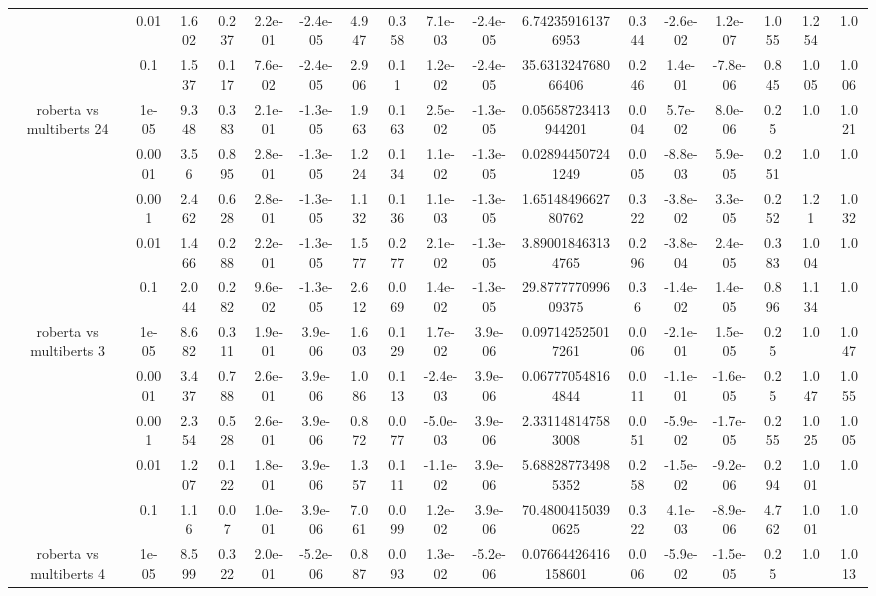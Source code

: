 \begin{tabular}{|c|c|c|c|c|c|c|c|c|c|c|c|c|c|c|c|c|}
 & 0.01 & 1.602 & 0.237 & 2.2e-01 & -2.4e-05 & 4.947 & 0.358 & 7.1e-03 & -2.4e-05 & 6.742359161376953 & 0.344 & -2.6e-02 & 1.2e-07 & 1.055 & 1.254 & 1.0 \\
 & 0.1 & 1.537 & 0.117 & 7.6e-02 & -2.4e-05 & 2.906 & 0.11 & 1.2e-02 & -2.4e-05 & 35.631324768066406 & 0.246 & 1.4e-01 & -7.8e-06 & 0.845 & 1.005 & 1.006 \\
\hline
\multirow{5}{*}{roberta  vs multiberts 24} & 1e-05 & 9.348 & 0.383 & 2.1e-01 & -1.3e-05 & 1.963 & 0.163 & 2.5e-02 & -1.3e-05 & 0.05658723413944201 & 0.004 & 5.7e-02 & 8.0e-06 & 0.25 & 1.0 & 1.021 \\
 & 0.0001 & 3.56 & 0.895 & 2.8e-01 & -1.3e-05 & 1.224 & 0.134 & 1.1e-02 & -1.3e-05 & 0.028944507241249 & 0.005 & -8.8e-03 & 5.9e-05 & 0.251 & 1.0 & 1.0 \\
 & 0.001 & 2.462 & 0.628 & 2.8e-01 & -1.3e-05 & 1.132 & 0.136 & 1.1e-03 & -1.3e-05 & 1.6514849662780762 & 0.322 & -3.8e-02 & 3.3e-05 & 0.252 & 1.21 & 1.032 \\
 & 0.01 & 1.466 & 0.288 & 2.2e-01 & -1.3e-05 & 1.577 & 0.277 & 2.1e-02 & -1.3e-05 & 3.890018463134765 & 0.296 & -3.8e-04 & 2.4e-05 & 0.383 & 1.004 & 1.0 \\
 & 0.1 & 2.044 & 0.282 & 9.6e-02 & -1.3e-05 & 2.612 & 0.069 & 1.4e-02 & -1.3e-05 & 29.877777099609375 & 0.36 & -1.4e-02 & 1.4e-05 & 0.896 & 1.134 & 1.0 \\
\hline
\multirow{5}{*}{roberta  vs multiberts 3} & 1e-05 & 8.682 & 0.311 & 1.9e-01 & 3.9e-06 & 1.603 & 0.129 & 1.7e-02 & 3.9e-06 & 0.097142525017261 & 0.006 & -2.1e-01 & 1.5e-05 & 0.25 & 1.0 & 1.047 \\
 & 0.0001 & 3.437 & 0.788 & 2.6e-01 & 3.9e-06 & 1.086 & 0.113 & -2.4e-03 & 3.9e-06 & 0.067770548164844 & 0.011 & -1.1e-01 & -1.6e-05 & 0.25 & 1.047 & 1.055 \\
 & 0.001 & 2.354 & 0.528 & 2.6e-01 & 3.9e-06 & 0.872 & 0.077 & -5.0e-03 & 3.9e-06 & 2.331148147583008 & 0.051 & -5.9e-02 & -1.7e-05 & 0.255 & 1.025 & 1.005 \\
 & 0.01 & 1.207 & 0.122 & 1.8e-01 & 3.9e-06 & 1.357 & 0.111 & -1.1e-02 & 3.9e-06 & 5.688287734985352 & 0.258 & -1.5e-02 & -9.2e-06 & 0.294 & 1.001 & 1.0 \\
 & 0.1 & 1.16 & 0.07 & 1.0e-01 & 3.9e-06 & 7.061 & 0.099 & 1.2e-02 & 3.9e-06 & 70.48004150390625 & 0.322 & 4.1e-03 & -8.9e-06 & 4.762 & 1.001 & 1.0 \\
\hline
\multirow{5}{*}{roberta  vs multiberts 4} & 1e-05 & 8.599 & 0.322 & 2.0e-01 & -5.2e-06 & 0.887 & 0.093 & 1.3e-02 & -5.2e-06 & 0.07664426416158601 & 0.006 & -5.9e-02 & -1.5e-05 & 0.25 & 1.0 & 1.013 \\

\end{tabular}
